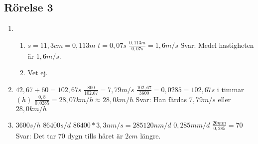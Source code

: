 \documentclass[a4paper,11pt]{article}
\begin{document}
\begin{flushleft}
\section{Rörelse 3}
\begin{enumerate}
  \item \begin{enumerate}
    \item $ s=11,3cm=0,113m $\newline
    $ t=0,07s $\newline
    $ \frac{0,113m}{0,07s}=1,6m/s $\newline
    Svar: Medel hastigheten är $ 1,6m/s $.
    \item Vet ej.
  \end{enumerate}
  \item $ 42,67+60=102,67s $\newline
  $ \frac{800}{102.67}=7,79m/s $\newline
  \newline
  $ \frac{102,67}{3600}=0,0285 = 102,67s $ i timmar$(h)$\newline
  \newline
  $ \frac{0,8}{0,0285}=28,07km/h\approx28,0km/h $\newline
  \newline
  Svar: Han färdas $ 7,79m/s $ eller $ 28,0km/h $
  
  
  \item $ 3600s/h $\newline
  $ 86400s/d $\newline
  $ 86400*3,3nm/s=285120nm/d $\newline
  $ 0,285mm/d $\newline
  $ \frac{20mm}{0,285}=70 $
  Svar: Det tar 70 dygn tills håret är $2cm$ längre.
\end{enumerate}
\end{flushleft}
\end{document}
